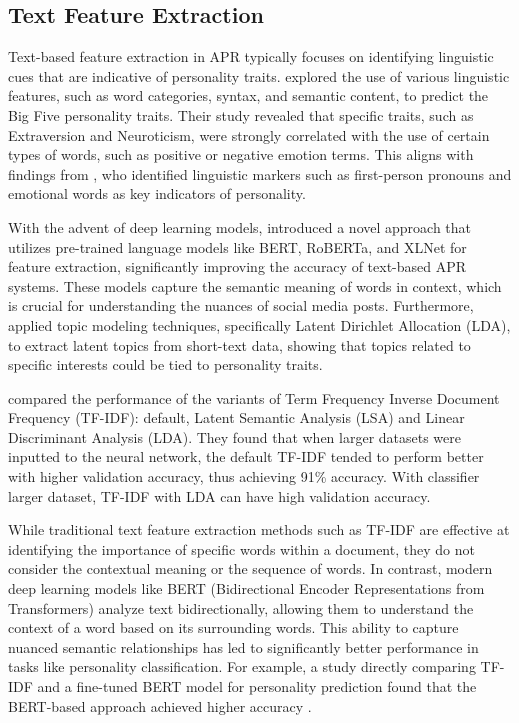 \subsection{Text Feature Extraction}

Text-based feature extraction in APR typically focuses on identifying linguistic cues that are indicative of personality traits. \citet{mairesse_using_2007} explored the use of various linguistic features, such as word categories, syntax, and semantic content, to predict the Big Five personality traits. Their study revealed that specific traits, such as Extraversion and Neuroticism, were strongly correlated with the use of certain types of words, such as positive or negative emotion terms. This aligns with findings from \citet{Pennebaker1999}, who identified linguistic markers such as first-person pronouns and emotional words as key indicators of personality.

With the advent of deep learning models, \citet{Christian2021} introduced a novel approach that utilizes pre-trained language models like BERT, RoBERTa, and XLNet for feature extraction, significantly improving the accuracy of text-based APR systems. These models capture the semantic meaning of words in context, which is crucial for understanding the nuances of social media posts. Furthermore, \citet{albalawi_using_2020} applied topic modeling techniques, specifically Latent Dirichlet Allocation (LDA), to extract latent topics from short-text data, showing that topics related to specific interests could be tied to personality traits.

\citet{Dzisevic_Sesok_2019} compared the performance of the variants of Term Frequency Inverse Document  Frequency (TF-IDF): default, Latent Semantic Analysis (LSA) and Linear Discriminant Analysis (LDA). They found that when larger datasets were inputted to the neural network, the default TF-IDF tended to perform better with higher validation accuracy, thus achieving 91\% accuracy. With classifier larger dataset, TF-IDF with LDA can have high validation accuracy.

While traditional text feature extraction methods such as TF-IDF are effective at identifying the importance of specific words within a document, they do not consider the contextual meaning or the sequence of words. In contrast, modern deep learning models like BERT (Bidirectional Encoder Representations from Transformers) analyze text bidirectionally, allowing them to understand the context of a word based on its surrounding words. This ability to capture nuanced semantic relationships has led to significantly better performance in tasks like personality classification. For example, a study directly comparing TF-IDF and a fine-tuned BERT model for personality prediction found that the BERT-based approach achieved higher accuracy \citep{Zhang_2023}. 


